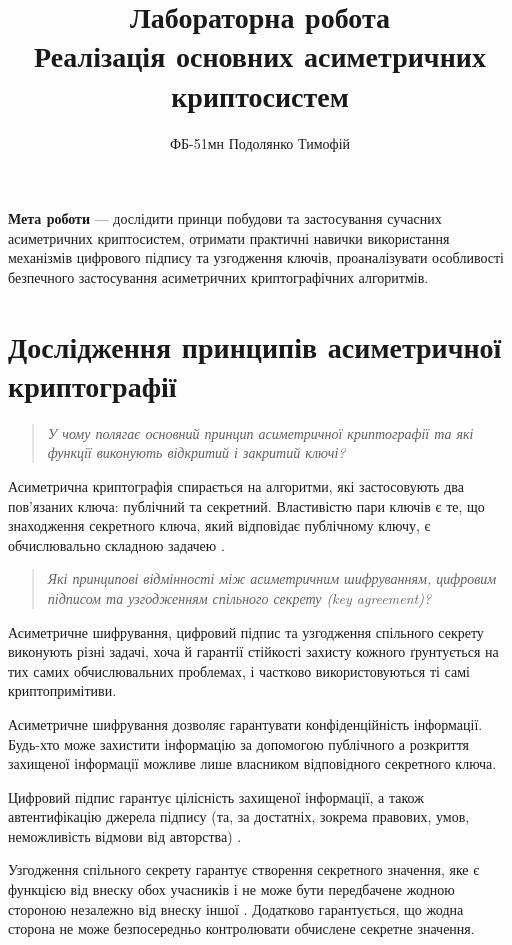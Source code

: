 \documentclass{kpi-lab}
\title{Лабораторна робота \textnumero 3\\
  Реалізація основних асиметричних криптосистем
}
\author{ФБ-51мн Подолянко Тимофій}
\date{}
\begin{document}
\maketitle
\setcounter{tocdepth}{1}
\tableofcontents
\bigskip

\textbf{Мета роботи} ---
дослідити принци побудови та застосування сучасних
асиметричних криптосистем,
отримати практичні навички використання механізмів
цифрового підпису та узгодження ключів,
проаналізувати особливості безпечного застосування
асиметричних криптографічних алгоритмів.

\chapter{Дослідження принципів асиметричної криптографії}
\label{chap:asymcrypt-principles}

\begin{quote}\small\it
  У чому полягає основний принцип асиметричної криптографії
  та які функції виконують відкритий і закритий ключі?
\end{quote}

Асиметрична криптографія спирається на алгоритми, які застосовують два
пов'язаних ключа: публічний та секретний. Властивістю пари
ключів є те, що знаходження секретного ключа, який
відповідає публічному ключу, є обчислювально складною
задачею \cite{nist-sp-800-57pt1r5}.

\begin{quote}\small\it
  Які принципові відмінності між асиметричним шифруванням,
  цифровим підписом та узгодженням спільного секрету (key agreement)?
\end{quote}

Асиметричне шифрування, цифровий підпис та узгодження
спільного секрету виконують різні задачі, хоча й гарантії
стійкості захисту кожного ґрунтується на тих самих
обчислювальних проблемах, і частково використовуються ті
самі криптопримітиви.

Асиметричне шифрування дозволяє гарантувати
конфіденційність інформації. Будь-хто може захистити
інформацію за допомогою публічного а розкриття захищеної інформації
можливе лише власником відповідного секретного ключа.

Цифровий підпис гарантує цілісність захищеної інформації, а також
автентифікацію джерела підпису (та, за достатніх, зокрема
правових, умов, неможливість відмови від авторства)
\cite{nist-sp-800-57pt1r5}.

Узгодження спільного секрету гарантує створення
секретного значення, яке є функцією від внеску обох учасників
і не може бути передбачене жодною стороною незалежно від
внеску іншої \cite{nist-sp-800-56ar3}.
Додатково гарантується, що жодна сторона не може
безпосередньо контролювати обчислене секретне значення.
\end{document}
